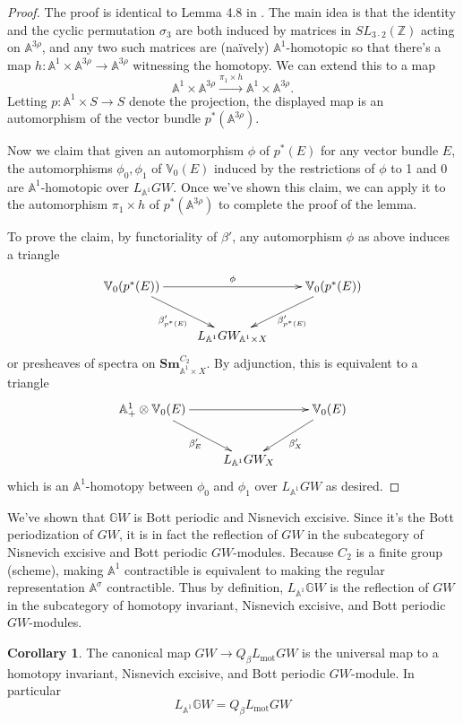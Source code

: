 \documentclass[edeposit,fullpage]{uiucthesis2009}
\newcommand{\Z}{\mathbb Z}
\newcommand{\mbb}{\mathbb}
\newcommand{\Sm}[1]{\mathbf{Sm}_{#1}}
\theoremstyle{plain}
\numberwithin{lemma}{section}
\theoremstyle{definition}
\newtheorem{corollary}[lemma]{Corollary}
\begin{document}
\begin{proof}
The proof is identical to Lemma 4.8 in \cite{cdhdesc}. The main idea
is that the identity and the cyclic permutation $\sigma_3$ are both
induced by matrices in $SL_{3\cdot 2}(\Z)$ acting on $\mbb A^{3\rho}$,
and any two such matrices are (na\"ively) $\mbb A^1$-homotopic so
that there's a map $h: \mbb A^1 \times \mbb A^{3\rho} \rightarrow \mbb
A^{3\rho}$ witnessing the homotopy. We can extend this to a map
\[
\mbb A^1 \times \mbb A^{3\rho} \xrightarrow{\pi_1 \times h} \mbb A^1 \times \mbb A^{3\rho}.
\]
Letting $p : \mbb A^1 \times S \rightarrow S$ denote the projection, the
displayed map is an automorphism of the vector bundle $p^*(\mbb
A^{3\rho})$.

Now we claim that given an automorphism $\phi$ of $p^*(E)$ for
any vector bundle $E$, the automorphisms $\phi_0,\phi_1$ of $\mbb
V_0(E)$ induced by the restrictions of $\phi$ to 1 and 0 are $\mbb
A^1$-homotopic over $L_{\mbb A^1}GW$. Once we've shown this claim, we can
apply it to the
automorphism $\pi_1 \times h$ of $p^*(\mbb A^{3\rho})$ to complete the
proof of the lemma. 

To prove the claim, by functoriality of $\beta'$, any automorphism
$\phi$ as above induces a triangle
\[
\xymatrix{\mbb V_0(p^*(E)) \ar[rr]^\phi \ar[dr]_{\beta'_{p^*(E)}} & & \mbb V_0(p^*(E))
  \ar[dl]^{\beta'_{p^*(E)}} \\ & L_{\mbb A^1}GW_{\mbb A^1 \times X}}
\]
or presheaves of spectra on $\Sm{\mbb A^1 \times X}^{C_2}$. By
adjunction, this is equivalent to a triangle
\[
\xymatrix{\mbb A^1_+ \otimes \mbb V_0(E) \ar[rr] \ar[dr]_{\beta'_E} && \mbb V_0(E)
  \ar[dl]^{\beta'_X} \\ & L_{\mbb A^1}GW_X}
\]
which is an $\mbb A^1$-homotopy between $\phi_0$ and $\phi_1$ over
$L_{\mbb A^1}GW$ as desired.
\end{proof}

We've shown that $\mbb GW$ is Bott periodic and
Nisnevich excisive. Since it's the Bott periodization of $GW$, it is
in fact the reflection of $GW$
in the subcategory of Nisnevich excisive and Bott periodic
$GW$-modules. Because $C_2$ is a finite group (scheme), making $\mbb
A^1$ contractible is equivalent to making the regular representation
$\mbb A^\sigma$ contractible. Thus by definition, $L_{\mbb A^1}\mbb
GW$ is the reflection of $GW$ in the subcategory of homotopy
invariant, Nisnevich excisive, and Bott periodic $GW$-modules. 

\begin{corollary}\label{cor:MotLoc_GW}
The canonical map $GW \rightarrow Q_{\beta}L_{\mathrm{mot}}GW$ is the universal
map to a homotopy invariant, Nisnevich excisive, and Bott periodic
$GW$-module. In particular
\[
L_{\mbb A^1}\mbb GW = Q_{\beta}L_{\mathrm{mot}}GW
\]
\end{corollary}
\end{document}

